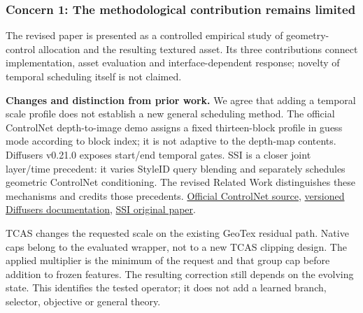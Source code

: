 \documentclass[
  10pt,
]{article}
\begin{document}
\hypertarget{concern-1-the-methodological-contribution-remains-limited}{%
\subsubsection{Concern 1: The methodological contribution remains
limited}\label{concern-1-the-methodological-contribution-remains-limited}}

The revised paper is presented as a controlled empirical study of
geometry-control allocation and the resulting textured asset. Its three
contributions connect implementation, asset evaluation and
interface-dependent response; novelty of temporal scheduling itself is
not claimed.

\textbf{Changes and distinction from prior work.} We agree that adding a
temporal scale profile does not establish a new general scheduling
method. The official ControlNet depth-to-image demo assigns a fixed
thirteen-block profile in guess mode according to block index; it is not
adaptive to the depth-map contents. Diffusers v0.21.0 exposes start/end
temporal gates. SSI is a closer joint layer/time precedent: it varies
StyleID query blending and separately schedules geometric ControlNet
conditioning. The revised Related Work distinguishes these mechanisms
and credits those precedents.
\href{https://github.com/lllyasviel/ControlNet/blob/f2e1bc38dc8d925fb542be4c138c46013ace1988/gradio_depth2image.py\#L49}{Official
ControlNet source},
\href{https://huggingface.co/docs/diffusers/v0.21.0/api/pipelines/controlnet}{versioned
Diffusers documentation}, \href{https://arxiv.org/html/2605.26538}{SSI
original paper}.

TCAS changes the requested scale on the existing GeoTex residual path.
Native caps belong to the evaluated wrapper, not to a new TCAS clipping
design. The applied multiplier is the minimum of the request and that
group cap before addition to frozen features. The resulting correction
still depends on the evolving state. This identifies the tested
operator; it does not add a learned branch, selector, objective or
general theory.
\end{document}
